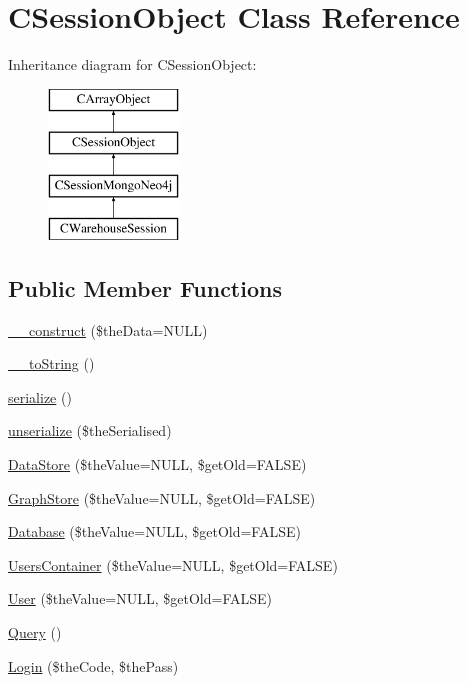 \hypertarget{class_c_session_object}{\section{C\-Session\-Object Class Reference}
\label{class_c_session_object}
}
Inheritance diagram for C\-Session\-Object\-:\begin{figure}[H]
\begin{center}
\leavevmode
\includegraphics[height=4.000000cm]{class_c_session_object}
\end{center}
\end{figure}
\subsection*{Public Member Functions}
\begin{DoxyCompactItemize}
\item 
\hyperlink{class_c_session_object_acf74287ee98aac046da0a13525029eb8}{\-\_\-\-\_\-construct} (\$the\-Data=N\-U\-L\-L)
\item 
\hyperlink{class_c_session_object_a991b6282a430f35b5acf2ad6cd4e5c39}{\-\_\-\-\_\-to\-String} ()
\item 
\hyperlink{class_c_session_object_a37b9597dba12c0cc62c444e1b371634d}{serialize} ()
\item 
\hyperlink{class_c_session_object_affb8710dfe4bc6464eb48f9aeb7d8d27}{unserialize} (\$the\-Serialised)
\item 
\hyperlink{class_c_session_object_a3c2fb7a5f1bfd878b5336944679c01fa}{Data\-Store} (\$the\-Value=N\-U\-L\-L, \$get\-Old=F\-A\-L\-S\-E)
\item 
\hyperlink{class_c_session_object_a7fd05281e6d014677e739845436d5451}{Graph\-Store} (\$the\-Value=N\-U\-L\-L, \$get\-Old=F\-A\-L\-S\-E)
\item 
\hyperlink{class_c_session_object_ae2e67e9c788e6a55568ae96b1f74b64f}{Database} (\$the\-Value=N\-U\-L\-L, \$get\-Old=F\-A\-L\-S\-E)
\item 
\hyperlink{class_c_session_object_aefd5962093881fa488ccf86f6f717a20}{Users\-Container} (\$the\-Value=N\-U\-L\-L, \$get\-Old=F\-A\-L\-S\-E)
\item 
\hyperlink{class_c_session_object_a1ef83c2632d67bff14b8e07960433441}{User} (\$the\-Value=N\-U\-L\-L, \$get\-Old=F\-A\-L\-S\-E)
\item 
\hyperlink{class_c_session_object_a80ee4a2049ab1f0aa962b346f1e75f05}{Query} ()
\item 
\hyperlink{class_c_session_object_a2835ebc41e4ca641476b0cf12d0782a4}{Login} (\$the\-Code, \$the\-Pass)
\end{DoxyCompactItemize}
